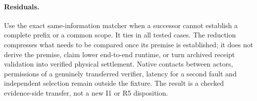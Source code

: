 \documentclass[11pt]{article}
\begin{document}
\paragraph{Residuals.}
Use the exact same-information matcher when a successor cannot
establish a complete prefix or a common scope. It ties in all tested
cases. The reduction compresses what needs to be compared once its
premise is established; it does not derive the premise, claim lower
end-to-end runtime, or turn archived receipt validation into verified
physical settlement. Native contacts between actors, permissions of
a genuinely transferred verifier, latency for a second fault and
independent selection remain outside the fixture. The result is
a checked evidence-side transfer, not a new I1 or R5 disposition.
\end{document}
